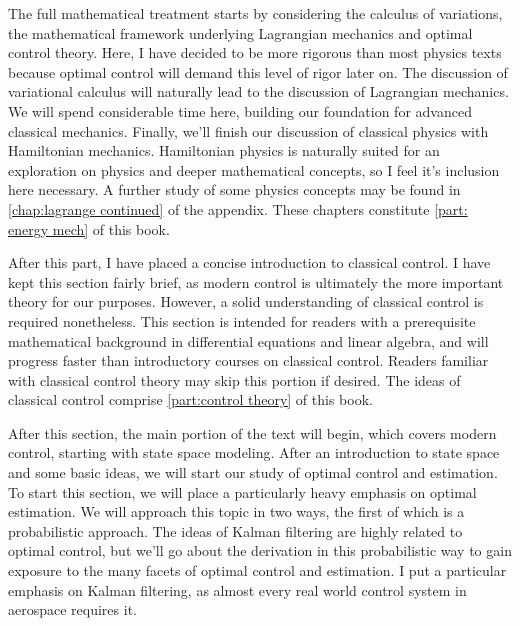 The full mathematical treatment starts by considering the calculus of variations, the mathematical framework underlying Lagrangian mechanics and optimal control theory. Here, I have decided to be more rigorous than most physics texts because optimal control will demand this level of rigor later on. The discussion of variational calculus will naturally lead to the discussion of Lagrangian mechanics. We will spend considerable time here, building our foundation for advanced classical mechanics. Finally, we'll finish our discussion of classical physics with Hamiltonian mechanics. Hamiltonian physics is naturally suited for an exploration on physics and deeper mathematical concepts, so I feel it's inclusion here necessary. A further study of some physics concepts may be found in \autoref{chap:lagrange continued} of the appendix. These chapters constitute \autoref{part: energy mech} of this book.


After this part, I have placed a concise introduction to classical control. I have kept this section fairly brief, as modern control is ultimately the more important theory for our purposes. However, a solid understanding of classical control is required nonetheless. This section is intended for readers with a prerequisite mathematical background in differential equations and linear algebra, and will progress faster than introductory courses on classical control. Readers familiar with classical control theory may skip this portion if desired. The ideas of classical control comprise \autoref{part:control theory} of this book.

After this section, the main portion of the text will begin, which covers modern control, starting with state space modeling.  After an introduction to state space and some basic ideas, we will start our study of optimal control and estimation. To start this section, we will place a particularly heavy emphasis on optimal estimation. We will approach this topic in two ways, the first of which is a probabilistic approach. The ideas of Kalman filtering are highly related to optimal control, but we'll go about the derivation in this probabilistic way to gain exposure to the many facets of optimal control and estimation. I put a particular emphasis on Kalman filtering, as almost every real world control system in aerospace requires it.

